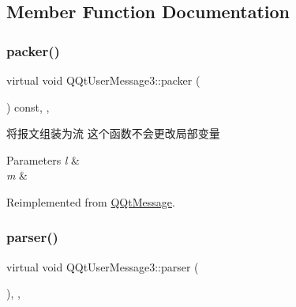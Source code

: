 \subsection{Member Function Documentation}
\mbox{\label{class_q_qt_user_message3_a935dc52a0f45e3fafcb1d1bed25dc23e}} 
\subsubsection{\texorpdfstring{packer()}{packer()}}
{\footnotesize\ttfamily virtual void Q\+Qt\+User\+Message3\+::packer (\begin{DoxyParamCaption}\item[{Q\+Byte\+Array \&}]{ }\end{DoxyParamCaption}) const\hspace{0.3cm}{\ttfamily [inline]}, {\ttfamily [override]}, {\ttfamily [virtual]}}



将报文组装为流 这个函数不会更改局部变量 


\begin{DoxyParams}{Parameters}
{\em l} & \\
\hline
{\em m} & \\
\hline
\end{DoxyParams}


Reimplemented from \mbox{\hyperlink{class_q_qt_message_af1885c2c3628495808dca66ee8d72e14}{Q\+Qt\+Message}}.

\mbox{\label{class_q_qt_user_message3_a903199240e4029b12db72a58bc0be53b}} 
\subsubsection{\texorpdfstring{parser()}{parser()}}
{\footnotesize\ttfamily virtual void Q\+Qt\+User\+Message3\+::parser (\begin{DoxyParamCaption}\item[{const Q\+Byte\+Array \&}]{ }\end{DoxyParamCaption})\hspace{0.3cm}{\ttfamily [inline]}, {\ttfamily [override]}, {\ttfamily [virtual]}}




